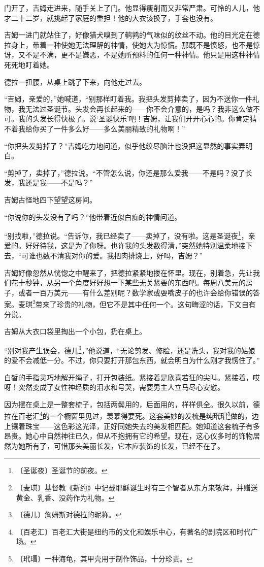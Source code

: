 \documentclass[12pt,UTF-8,openany]{ctexbook}
\begin{document}
\begin{large}
    门开了，吉姆走进来，随手关上了门。他显得瘦削而又非常严肃。可怜的人儿，他才二十二岁，就挑起了家庭的重担！他的大衣该换了，手套也没有。
    
    吉姆一进门就站住了，好像猎犬嗅到了鹌鹑的气味似的纹丝不动。他的目光定在德拉身上，带着一种使她无法理解的神情，使她大为惊慌。那既不是愤怒，也不是惊讶，又不是不满，更不是嫌恶，不是她所预料的任何一种神情。他只是用这种神情死死地盯着她。
    
    德拉一扭腰，从桌上跳了下来，向他走过去。
    
    “吉姆，亲爱的，”她喊道，“别那样盯着我。我把头发剪掉卖了，因为不送你一件礼物，我无法过圣诞节。头发会再长起来的——你不会介意的，是吗？我非这么做不可。我的头发长得快极了。说‘圣诞快乐’吧！吉姆，让我们开开心心的。你肯定猜不着我给你买了一件多么好——多么美丽精致的礼物啊！”
    
    “你把头发剪掉了？”吉姆吃力地问道，似乎他绞尽脑汁也没把这显然的事实弄明白。
    
    “剪掉了，卖掉了，”德拉说。“不管怎么说，你还是那么爱我——不是吗？没了长发，我还是我——不是吗？”
    
    吉姆古怪地四下望望这房间。
    
    “你说你的头发没有了吗？”他带着近似白痴的神情问道。
    
    “别找啦，”德拉说。“告诉你，我已经卖了——卖掉了，没有啦。这是圣诞夜\footnote{〔圣诞夜〕圣诞节的前夜。}，亲爱的。好好待我，这是为了你呀。也许我的头发数得清，”突然她特别温柔地接下去，“可谁也数不清我对你的爱。我把肉排烧上，好吗，吉姆？”
    
    吉姆好像忽然从恍惚之中醒来了，把德拉紧紧地搂在怀里。现在，别着急，先让我们花十秒钟，从另一个角度好好想一下某些无关紧要的东西吧。每周八美元的房子，或者一百万美元——有什么差别呢？数学家或耍嘴皮子的也许会给你错误的答案。麦琪\footnote{〔麦琪〕基督教《新约》中记载耶稣诞生时有三个智者从东方来敬拜，并赠送黄金、乳香、没药作为礼物。}带来了珍贵的礼物，但它不是其中任何一个。这句晦涩的话，下文自有分说。
    
    吉姆从大衣口袋里掏出一个小包，扔在桌上。
    
    “别对我产生误会，德儿\footnote{〔德儿〕詹姆斯对德拉的昵称。}，”他说道，“无论剪发、修脸，还是洗头，我对我的姑娘的爱不会减低一分。不过，你只要打开那包东西，就会明白为什么刚才我愣住了。”
    
    白皙的手指灵巧地解开绳子，打开包装纸。紧接着是欣喜若狂的尖叫。紧接着，哎呀！突然变成了女性神经质的泪水和号哭，需要男主人立马尽心安慰。
    
    因为摆在桌上是一整套梳子，包括两鬓用的，后面用的，样样俱全。很久以前，德拉在百老汇\footnote{〔百老汇〕百老汇大街是纽约市的文化和娱乐中心，有著名的剧院区和时代广场。}的一个橱窗里见过，羡慕得要死。这套美妙的发梳是纯玳瑁\footnote{〔玳瑁〕一种海龟，其甲壳用于制作饰品，十分珍贵。}做的，边上镶着珠宝——这色彩这光泽，正好同她失去的美发相匹配。她知道这套梳子有多昂贵。她心中自然神往已久，但从不抱拥有它的希望。现在，这心仪多时的饰物居然为她所有了，可惜那头美丽长发，它本应装饰的长发，已经不在了。
    

\end{large}
\end{document}
